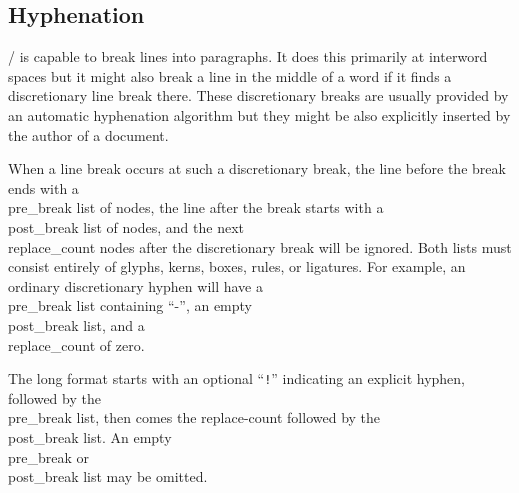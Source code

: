

\subsection{Hyphenation}\label{hyphen}
\HINT/ is capable to break lines into paragraphs. It does this
primarily at interword spaces but it might also break a line in the
middle of a word if it finds a discretionary
line break there. These discretionary breaks are usually
provided by an automatic hyphenation algorithm but they might be also
explicitly inserted by the author of a
document.

When a line break occurs at such a discretionary break, the line
before the break ends with a \\{pre\_break} list of nodes, the line after
the break starts with a \\{post\_break} list of nodes, and the next
\\{replace\_count} nodes after the discretionary break will be
ignored. Both lists must consist entirely of glyphs,
kerns, boxes, rules, or
ligatures.  For example, an ordinary discretionary
hyphen will have a \\{pre\_break} list containing ``-'', an empty
\\{post\_break} list, and a \\{replace\_count} of zero.

The long format starts with an optional ``{\tt !}'' indicating an explicit hyphen,
followed by the  \\{pre\_break} list, then comes the replace-count followed
by the  \\{post\_break} list. An empty  \\{pre\_break} or \\{post\_break} list may be omitted.

